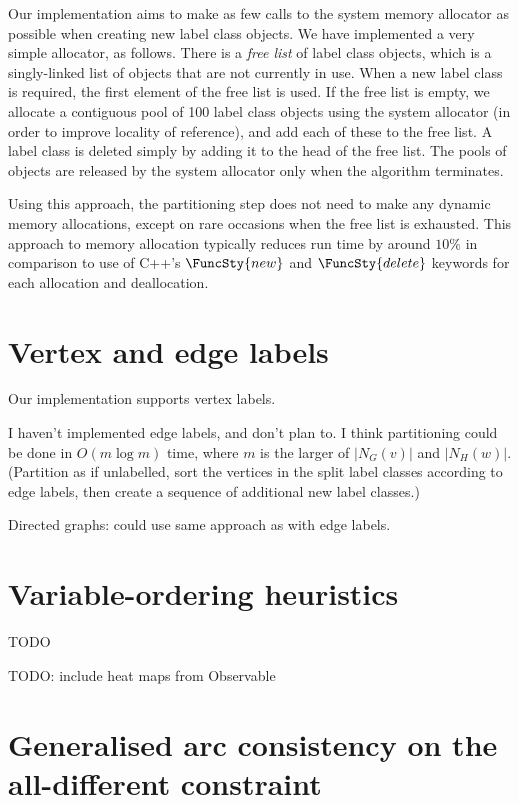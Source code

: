 Our implementation aims to make as few calls to the system memory allocator as possible when creating
new label class objects.  We have implemented a very simple allocator, as follows.  There is a \emph{free list}
of label class objects, which is a singly-linked list of objects that are not currently in use.  When
a new label class is required, the first element of the free list is used.  If the free list is empty,
we allocate a contiguous pool of 100 label class objects using the system allocator (in order to improve
locality of reference), and add each of these to the free list.  A label class is deleted simply by
adding it to the head of the free list.  The pools of objects are released by the system allocator only when
the algorithm terminates.

Using this approach, the partitioning step does not need to make any dynamic memory allocations, except
on rare occasions when the free list is exhausted.
This approach to memory allocation typically reduces run time by around $10\%$ in comparison to use of
C++'s $\FuncSty{new}$ and $\FuncSty{delete}$ keywords for each allocation and deallocation.

\section{Vertex and edge labels}

Our implementation supports vertex labels.

I haven't implemented edge labels, and don't plan to.
I think partitioning could be done in $O(m \log m)$ time, where
$m$ is the larger of $|N_G(v)|$ and $|N_H(w)|$. (Partition as if unlabelled, sort the vertices in
the split label classes according to edge labels, then create a sequence of additional new label classes.)

Directed graphs: could use same approach as with edge labels.

\section{Variable-ordering heuristics}

TODO

TODO: include heat maps from Observable

\section{Generalised arc consistency on the all-different constraint}

